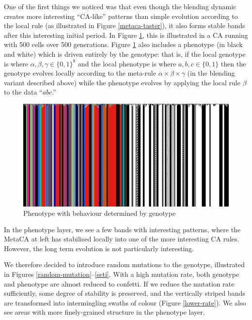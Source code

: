 \documentclass{AISB2008}
\makeatletter
\renewcommand{\boxed}[1]{\text{\fboxsep=.2em\fbox{\m@th$\displaystyle#1$}}}
\newcommand{\mystrut}{\vphantom{b\gamma}}
\makeatother
\begin{document}
One of the first things we noticed was that even though the blending
dynamic creates more interesting ``CA-like'' patterns than simple
evolution according to the local rule (as illustrated in Figure
\ref{metaca-taster}), it also forms stable bands after this
interesting initial period.  In Figure \ref{flag}, this is illustrated
in a CA running with 500 cells over 500 generations.  Figure
\ref{flag} also includes a phenotype (in black and white) which is
driven entirely by the genotype: that is, if the local genotype is
\boxed{\alpha\mystrut}\boxed{\beta\mystrut}\boxed{\gamma\mystrut} 
where $\alpha, \beta, \gamma \in \{0,1\}^8$
and the local phenotype is
%
\boxed{a\mystrut}\boxed{b\mystrut}\boxed{c\mystrut}
where $a, b, c \in \{0,1\}$
%
then the genotype evolves locally according to the meta-rule $\alpha
\times \beta \times \gamma$ (in the blending variant described above)
while the phenotype evolves by applying the local rule $\beta$ to the
data ``$abc$.''

\begin{figure}
\includegraphics[width=\columnwidth]{flag.png}
\caption{Phenotype with behaviour determined by genotype\label{flag}}
\end{figure}

In the phenotype layer, we see a few bands with interesting patterns,
where the MetaCA at left has stabilised locally into one of the more
interesting CA rules.  However, the long term evolution is not
particularly interesting.  

We therefore decided to introduce random mutations to the genotype,
illustrated in Figures \ref{random-mutation}--\ref{seti}.  With a high
mutation rate, both genotype and phenotype are almost reduced to
confetti.  If we reduce the mutation rate sufficiently, some degree of
stability is preserved, and the vertically striped bands are
transformed into intermingling swaths of colour (Figure
\ref{lower-rate}).  We also see areas with more finely-grained
structure in the phenotype layer.  
\end{document}
